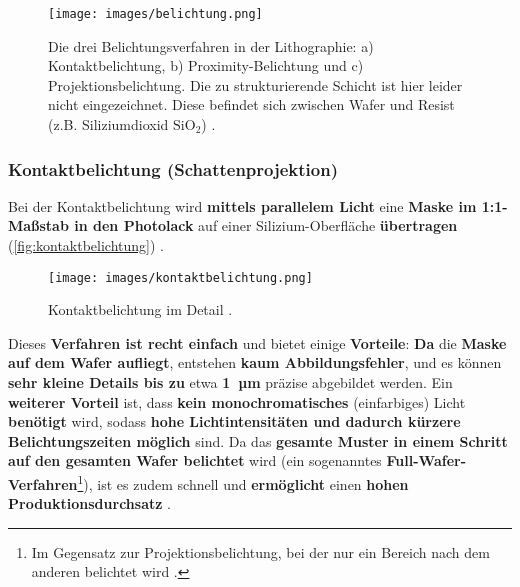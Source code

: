 \documentclass{article} %
\begin{document}
\begin{figure}[htb!]
    \centering
    \texttt{[image: images/belichtung.png]} %
    \captionsetup{labelfont=bf, width=\textwidth} %
    \caption{Die drei Belichtungsverfahren in der Lithographie: a) Kontaktbelichtung, b) Proximity-Belichtung und c) Projektionsbelichtung. Die zu strukturierende Schicht ist hier leider nicht eingezeichnet. Diese befindet sich zwischen Wafer und Resist (z.B. Siliziumdioxid $\mathrm{SiO}_2$) \cite{cowburn1997}.}
    \label{fig:belichtung}
\end{figure}





\vspace{1em}

\subsubsection{Kontaktbelichtung (Schattenprojektion)}

\vspace{1em}

Bei der Kontaktbelichtung wird \textbf{mittels parallelem Licht} eine \textbf{Maske im 1:1-Maßstab in den Photolack} auf einer Silizium-Oberfläche \textbf{übertragen} (\autoref{fig:kontaktbelichtung}) \cite{Mescheder2004}.

\begin{figure}[htb!]
    \centering
    \texttt{[image: images/kontaktbelichtung.png]} %
    \captionsetup{labelfont=bf, width=\textwidth} %
    \caption{Kontaktbelichtung im Detail \cite{schmid2024}.}
    \label{fig:kontaktbelichtung}
\end{figure}

\vspace{1em}

Dieses \textbf{Verfahren ist recht einfach} und bietet einige \textbf{Vorteile}: \textbf{Da} die \textbf{Maske auf dem Wafer aufliegt}, entstehen \textbf{kaum Abbildungsfehler}, und es können \textbf{sehr kleine Details bis zu} etwa \textbf{1~µm} präzise abgebildet werden. Ein \textbf{weiterer Vorteil} ist, dass \textbf{kein monochromatisches} (einfarbiges) Licht \textbf{benötigt} wird, sodass \textbf{hohe Lichtintensitäten und dadurch kürzere Belichtungszeiten möglich} sind. Da das \textbf{gesamte Muster in einem Schritt auf den gesamten Wafer belichtet} wird (ein sogenanntes \textbf{Full-Wafer-Verfahren}\footnote{Im Gegensatz zur Projektionsbelichtung, bei der nur ein Bereich nach dem anderen belichtet wird \cite{Mescheder2004}.}), ist es zudem schnell und \textbf{ermöglicht} einen \textbf{hohen Produktionsdurchsatz} \cite{schmid2024}.
\end{document}
